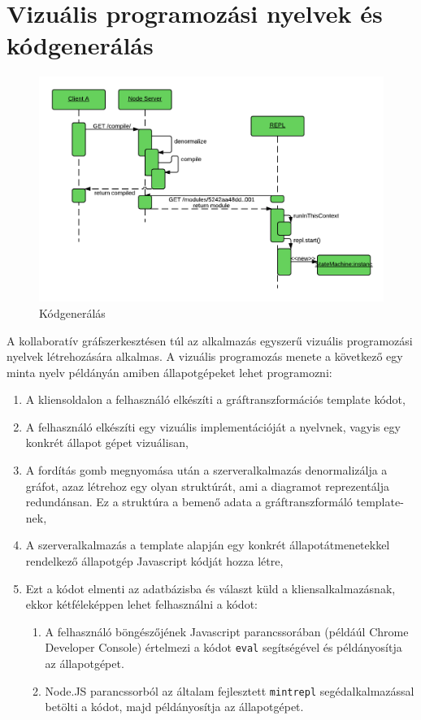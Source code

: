 \section{Vizuális programozási nyelvek és kódgenerálás}

\begin{figure}[!ht]
\centering
\includegraphics[width=15cm,keepaspectratio]{figures/compile-seq.png}
\caption{Kódgenerálás}
\label{fig:compileseq}
\end{figure}

A kollaboratív gráfszerkesztésen túl az alkalmazás egyszerű vizuális programozási nyelvek létrehozására alkalmas.
A vizuális programozás menete a következő egy minta nyelv példányán amiben állapotgépeket lehet programozni:
\begin{enumerate}
\item A kliensoldalon a felhasználó elkészíti a gráftranszformációs template kódot,
\item A felhasználó elkészíti egy vizuális implementációját a nyelvnek, vagyis egy konkrét állapot gépet vizuálisan,
\item A fordítás gomb megnyomása után a szerveralkalmazás denormalizálja a gráfot, azaz létrehoz egy olyan struktúrát, ami a diagramot reprezentálja redundánsan. Ez a struktúra a bemenő adata a gráftranszformáló template-nek,
\item A szerveralkalmazás a template alapján egy konkrét állapotátmenetekkel rendelkező állapotgép Javascript kódját hozza létre,
\item Ezt a kódot elmenti az adatbázisba és választ küld a kliensalkalmazásnak, ekkor kétféleképpen lehet felhasználni a kódot:
\begin{enumerate}
    \item A felhasználó böngészőjének Javascript parancssorában (példáúl Chrome Developer Console) értelmezi a kódot \lstinline{eval} segítségével és példányosítja az állapotgépet. 
    \item Node.JS parancssorból az általam fejlesztett \lstinline{mintrepl} segédalkalmazással betölti a kódot, majd példányosítja az állapotgépet.
\end{enumerate}
\end{enumerate}


